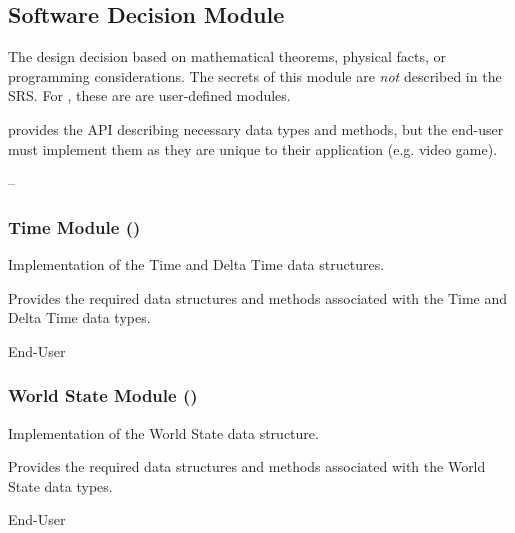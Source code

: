 \subsection{Software Decision Module}

\begin{description}[font=\scshape]
    \item[Secrets:] The design decision based on mathematical theorems,
    physical facts, or programming considerations. The secrets of this module
    are \emph{not} described in the SRS. For \progname{}, these are are
    user-defined modules.

    \item[Services:] \progname{} provides the API describing necessary data
    types and methods, but the end-user must implement them as they are unique
    to their application (e.g. video game).

    \item[Implemented By:] --
\end{description}

\subsubsection{Time Module ()}

\begin{description}[font=\scshape]
    \item[Secrets:] Implementation of the Time and Delta Time data structures.

    \item[Services:]  Provides the required data structures and methods
    associated with the Time and Delta Time data types.

    \item[Implemented By:] End-User
\end{description}

\subsubsection{World State Module ()}

\begin{description}[font=\scshape]
    \item[Secrets:] Implementation of the World State data structure.

    \item[Services:] Provides the required data structures and methods
    associated with the World State data types.

    \item[Implemented By:] End-User
\end{description}
